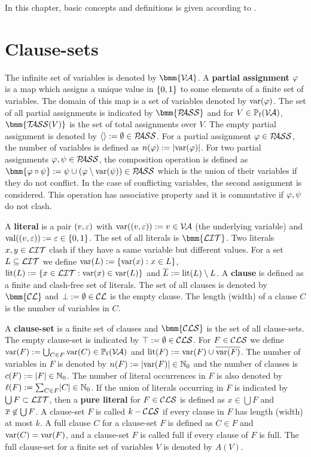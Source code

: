 \documentclass{report}
\begin{document}
In this chapter, basic concepts and definitions is given according to \cite{GwynneKullmann2013GoodRepresentationsIIex, BeyersdorffKullmann2014PHP,KullmannZhao2010Extremal}. 

\section{Clause-sets}
\label{sec:Clause-sets}

The infinite set of variables is denoted by $\bmm{\Va}$. A \textbf{partial assignment} $\varphi$ is a map which assigns a unique value in $\{ 0,1 \}$ to some elements of a finite set of variables. The domain of this map is a set of variables denoted by $\operatorname{var}(\varphi)$. The set of all partial assignments is indicated by $\bmm{\Pass}$ and for $V \in \operatorname{\mathbb{P}_f}(\mathcal{V\hspace{-0.1em}A})$, $\bmm{\Tass(V)}$ is the set of total assignments over $V$. The empty partial assignment is denoted by $\langle  \rangle:= \emptyset \in \mathcal{P\hspace{-0.32em}ASS}$. For a partial assignment $\varphi \in \mathcal{P\hspace{-0.32em}ASS}$, the number of variables is defined as $n(\varphi):=\lvert \operatorname{var}(\varphi) \rvert$. For two partial assignments $\varphi, \psi \in \mathcal{P\hspace{-0.32em}ASS}$, the composition operation is defined as $\bmm{\vp \circ \psi} := \psi \cup (\vp \sm \var(\psi)) \in \Pass$ which is the union of their variables if they do not conflict. In the case of conflicting variables, the second assignment is considered. This operation has associative property and it is commutative if $\varphi, \psi$ do not clash.

A \textbf{literal} is a pair $(v,\varepsilon)$ with $\operatorname{var}((v,\varepsilon)):=v \in \mathcal{V\hspace{-0.1em}A}$ (the underlying variable) and $\operatorname{val}((v,\varepsilon)):=\varepsilon \in \{ 0,1 \}$. The set of all literals is $\bmm{\Lit}$. Two literals $x, y \in \mathcal{LIT}$ clash if they have a same variable but different values. For a set $L \subseteq \mathcal{LIT}$ we define $\operatorname{var}(L) := \{ \operatorname{var}(x) :x \in L \}$, $\operatorname{lit}(L):= \{ x \in \mathcal{LIT} : \operatorname{var}(x) \in \operatorname{var}(L) \}$ and $\overline{L} := \operatorname{lit}(L) \setminus L$. A \textbf{clause} is defined as a finite and clash-free set of literals. The set of all clauses is denoted by $\bmm{\Cl}$ and $\bot := \emptyset \in \mathcal{CL}$ is the empty clause. The length (width) of a clause $C$ is the number of variables in $C$.

A \textbf{clause-set} is a finite set of clauses and $\bmm{\Cls}$ is the set of all clause-sets. The empty clause-set is indicated by $\top := \emptyset \in \mathcal{CLS}$. For $F \in \mathcal{CLS}$ we define $\operatorname{var}(F) := \bigcup_{C \in F} \operatorname{var}(C) \in \operatorname{\mathbb{P}_f}(\mathcal{V\hspace{-0.1em}A})$ and $\operatorname{lit}(F) := \operatorname{var}(F) \cup \overline{\operatorname{var}(F)}$. The number of variables in $F$ is denoted by $n(F) := \lvert \operatorname{var}(F) \rvert \in \mathbb{N}_0$ and the number of clauses is $c(F) := \lvert F \rvert \in \mathbb{N}_0$. The number of literal occurrences in $F$ is also denoted by $\ell(F) := \sum_{C \in F} \lvert C \rvert \in \mathbb{N}_0$. If the union of literals occurring in $F$ is indicated by $\bigcup F \subset \mathcal{LIT}$, then a \textbf{pure literal} for $F \in \mathcal{CLS}$ is defined as $x \in \bigcup F$ and $\overline{x} \not \in \bigcup F$. A clause-set $F$ is called $k-\mathcal{CLS}$ if every clause in $F$ has length (width) at most $k$. A full clause $C$  for a clause-set $F$ is defined as $C \in F$ and $\operatorname{var}(C) = \operatorname{var}(F)$, and a clause-set $F$ is called full if every clause of $F$ is full. The full clause-set for a finite set of variables $V$ is denoted by $A(V)$. 
\end{document}
